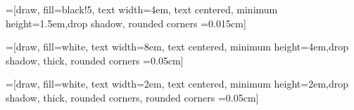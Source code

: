 \usepackage{pgf}
\usetikzlibrary{arrows.meta, arrows, positioning, shadows, shapes, backgrounds}
\usepackage{pgfkeys}

 
 
 
=[draw, fill=black!5,   text width=4em,
text centered, minimum height=1.5em,drop shadow, rounded corners =0.015cm]
 
=[draw, fill=white,   text width=8em,
text centered, minimum height=4em,drop shadow, thick, rounded corners =0.05cm] 

=[draw, fill=white,   text width=2em,
text centered, minimum height=2em,drop shadow, thick, rounded corners, rounded corners =0.05cm] 

\tikzset{font=\scriptsize}


\usetikzlibrary{external,circuits}